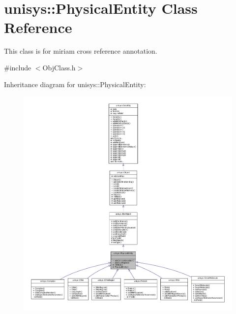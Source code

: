 \hypertarget{classunisys_1_1PhysicalEntity}{\section{unisys\-:\-:Physical\-Entity Class Reference}
\label{classunisys_1_1PhysicalEntity}
}


This class is for miriam cross reference annotation.  




{\ttfamily \#include $<$Obj\-Class.\-h$>$}



Inheritance diagram for unisys\-:\-:Physical\-Entity\-:
\nopagebreak
\begin{figure}[H]
\begin{center}
\leavevmode
\includegraphics[width=350pt]{classunisys_1_1PhysicalEntity__inherit__graph}
\end{center}
\end{figure}


